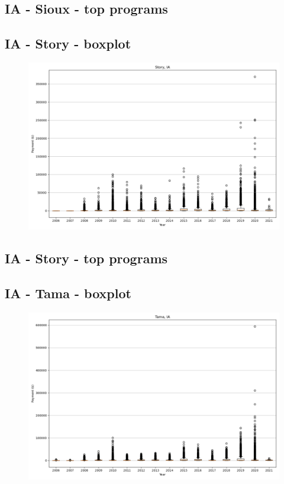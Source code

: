 \subsection*{IA - Sioux - top programs}

\newpage
\subsection*{IA - Story - boxplot}
\begin{figure}[h]
\centering
\includegraphics[width=7in]{../output/boxplots/counties/Story-IA_boxplot.png}
\end{figure}


\subsection*{IA - Story - top programs}

\newpage
\subsection*{IA - Tama - boxplot}
\begin{figure}[h]
\centering
\includegraphics[width=7in]{../output/boxplots/counties/Tama-IA_boxplot.png}
\end{figure}


